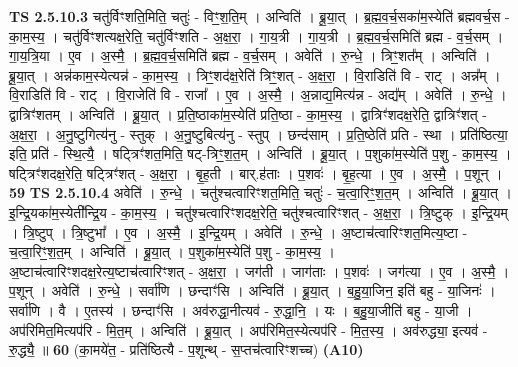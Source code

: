 \documentclass[17pt]{extarticle}
\begin{document}
                  \newline
                                \textbf{ TS 2.5.10.3} \newline
                  चतु॑र्विꣳशति॒मिति॒ चतुः॑ - विꣳ॒॒श॒ति॒म् । अन्विति॑ । ब्रू॒या॒त् । ब्र॒ह्म॒व॒र्च॒सका॑म॒स्येति॑ ब्रह्मवर्च॒स - का॒म॒स्य॒ । चतु॑र्विꣳशत्यक्ष॒रेति॒ चतु॑र्विꣳशति - अ॒क्ष॒रा॒ । गा॒य॒त्री । गा॒य॒त्री । ब्र॒ह्म॒व॒र्च॒समिति॑ ब्रह्म - व॒र्च॒सम् । गा॒य॒त्रि॒या । ए॒व । अ॒स्मै॒ । ब्र॒ह्म॒व॒र्च॒समिति॑ ब्रह्म - व॒र्च॒सम् । अवेति॑ । रु॒न्धे॒ । त्रिꣳ॒॒शत᳚म् । अन्विति॑ । ब्रू॒या॒त् । अन्न॑काम॒स्येत्यन्न॑ - का॒म॒स्य॒ । त्रिꣳ॒॒शद॑क्ष॒रेति॑ त्रिꣳ॒॒शत् - अ॒क्ष॒रा॒ । वि॒राडिति॑ वि - राट् । अन्न᳚म् । वि॒राडिति॑ वि - राट् । वि॒राजेति॑ वि - राजा᳚ । ए॒व । अ॒स्मै॒ । अ॒न्नाद्य॒मित्य॑न्न - अद्य᳚म् । अवेति॑ । रु॒न्धे॒ । द्वात्रिꣳ॑शतम् । अन्विति॑ । ब्रू॒या॒त् । प्र॒ति॒ष्ठाका॑म॒स्येति॑ प्रति॒ष्ठा - का॒म॒स्य॒ । द्वात्रिꣳ॑शदक्ष॒रेति॒ द्वात्रिꣳ॑शत् - अ॒क्ष॒रा॒ । अ॒नु॒ष्टुगित्य॑नु - स्तुक् । अ॒नु॒ष्टुबित्य॑नु - स्तुप् । छन्द॑साम् । प्र॒ति॒ष्ठेति॑ प्रति - स्था । प्रति॑ष्ठित्या॒ इति॒ प्रति॑ - स्थि॒त्यै॒ । षट्त्रिꣳ॑शत॒मिति॒ षट्-त्रिꣳ॒॒श॒त॒म् । अन्विति॑ । ब्रू॒या॒त् । प॒शुका॑म॒स्येति॑ प॒शु - का॒म॒स्य॒ । षट्त्रिꣳ॑शदक्ष॒रेति॒ षट्त्रिꣳ॑शत् - अ॒क्ष॒रा॒ । बृ॒ह॒ती । बार्.ह॑ताः । प॒शवः॑ । बृ॒ह॒त्या । ए॒व । अ॒स्मै॒ । प॒शून् । \textbf{  59} \newline
                  \newline
                                \textbf{ TS 2.5.10.4} \newline
                  अवेति॑ । रु॒न्धे॒ । चतु॑श्चत्वारिꣳशत॒मिति॒ चतुः॑ - च॒त्वा॒रिꣳ॒॒श॒त॒म् । अन्विति॑ । ब्रू॒या॒त् । इ॒न्द्रि॒यका॑म॒स्येती᳚न्द्रि॒य - का॒म॒स्य॒ । चतु॑श्चत्वारिꣳशदक्ष॒रेति॒ चतु॑श्चत्वारिꣳशत् - अ॒क्ष॒रा॒ । त्रि॒ष्टुक् । इ॒न्द्रि॒यम् । त्रि॒ष्टुप् । त्रि॒ष्टुभा᳚ । ए॒व । अ॒स्मै॒ । इ॒न्द्रि॒यम् । अवेति॑ । रु॒न्धे॒ । अ॒ष्टाच॑त्वारिꣳशत॒मित्य॒ष्टा - च॒त्वा॒रिꣳ॒॒श॒त॒म् । अन्विति॑ । ब्रू॒या॒त् । प॒शुका॑म॒स्येति॑ प॒शु - का॒म॒स्य॒ । अ॒ष्टाच॑त्वारिꣳशदक्ष॒रेत्य॒ष्टाच॑त्वारिꣳशत् - अ॒क्ष॒रा॒ । जग॑ती । जाग॑ताः । प॒शवः॑ । जग॑त्या । ए॒व । अ॒स्मै॒ । प॒शून् । अवेति॑ । रु॒न्धे॒ । सर्वा॑णि । छन्दाꣳ॑सि । अन्विति॑ । ब्रू॒या॒त् । ब॒हु॒या॒जिन॒ इति॑ बहु - या॒जिनः॑ । सर्वा॑णि । वै । ए॒तस्य॑ । छन्दाꣳ॑सि । अव॑रुद्धा॒नीत्यव॑ - रु॒द्धा॒नि॒ । यः । ब॒हु॒या॒जीति॑ बहु - या॒जी । अप॑रिमित॒मित्यप॑रि - मि॒त॒म् । अन्विति॑ । ब्रू॒या॒त् । अप॑रिमित॒स्येत्यप॑रि - मि॒त॒स्य॒ । अव॑रुद्ध्या॒ इत्यव॑ - रु॒द्ध्यै॒ ॥ \textbf{  60} \newline
                  \newline
                      (का॒मये॑त॒ - प्रति॑ष्ठित्यै - प॒शून्थ् - स॒प्तच॑त्वारिꣳशच्च)  \textbf{(A10)} \newline \newline
\end{document}
